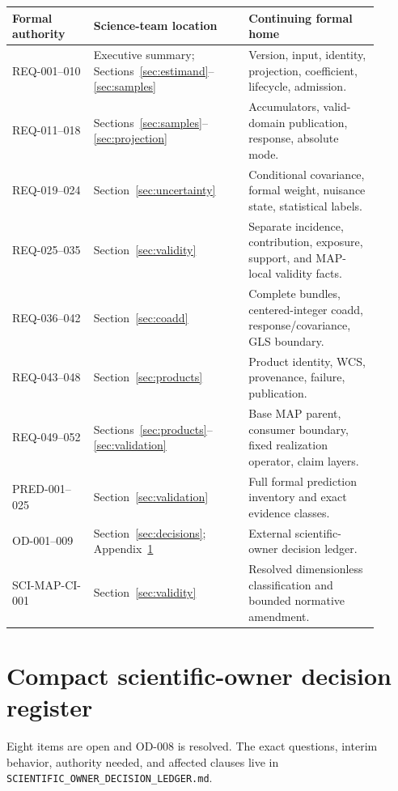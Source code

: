 \documentclass[10pt]{article}
\newcommand{\code}[1]{\nolinkurl{#1}}
\begin{document}
\begin{longtable}{L{0.20\linewidth}L{0.38\linewidth}L{0.32\linewidth}}
\toprule Formal authority & Science-team location & Continuing formal home \\
\midrule
REQ-001--010 & Executive summary; Sections~\ref{sec:estimand}--\ref{sec:samples} & Version, input, identity, projection, coefficient, lifecycle, admission.\\
REQ-011--018 & Sections~\ref{sec:samples}--\ref{sec:projection} & Accumulators, valid-domain publication, response, absolute mode.\\
REQ-019--024 & Section~\ref{sec:uncertainty} & Conditional covariance, formal weight, nuisance state, statistical labels.\\
REQ-025--035 & Section~\ref{sec:validity} & Separate incidence, contribution, exposure, support, and MAP-local validity facts.\\
REQ-036--042 & Section~\ref{sec:coadd} & Complete bundles, centered-integer coadd, response/covariance, GLS boundary.\\
REQ-043--048 & Section~\ref{sec:products} & Product identity, WCS, provenance, failure, publication.\\
REQ-049--052 & Sections~\ref{sec:products}--\ref{sec:validation} & Base MAP parent, consumer boundary, fixed realization operator, claim layers.\\
PRED-001--025 & Section~\ref{sec:validation} & Full formal prediction inventory and exact evidence classes.\\
OD-001--009 & Section~\ref{sec:decisions}; Appendix~\ref{app:decisions} & External scientific-owner decision ledger.\\
SCI-MAP-CI-001 & Section~\ref{sec:validity} & Resolved dimensionless classification and bounded normative amendment.\\
\bottomrule
\end{longtable}

\clearpage
\section{Compact scientific-owner decision register}\label{app:decisions}
Eight items are open and OD-008 is resolved. The exact questions, interim behavior, authority needed,
and affected clauses live in \code{SCIENTIFIC_OWNER_DECISION_LEDGER.md}.
\end{document}
